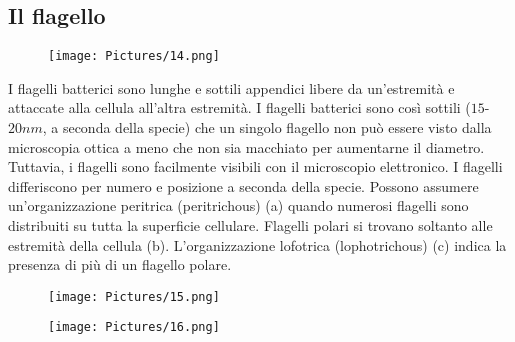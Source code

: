 \subsection{Il flagello}
\begin{figure}[H]
	\texttt{[image: Pictures/14.png]}
\end{figure}

I flagelli batterici sono lunghe e sottili appendici libere da un'estremità e attaccate alla cellula all'altra estremità. I flagelli batterici sono così 
sottili ($15$-$20 nm$, a seconda della specie) che un singolo flagello non può essere visto dalla microscopia ottica a meno che non sia macchiato per aumentarne 
il diametro. Tuttavia, i flagelli sono facilmente visibili con il microscopio elettronico. I flagelli differiscono per numero e posizione  a seconda della 
specie. Possono assumere un’organizzazione peritrica (peritrichous) (a) quando numerosi flagelli 
sono distribuiti su tutta la superficie cellulare. Flagelli polari si trovano soltanto alle estremità della cellula (b). L’organizzazione lofotrica 
(lophotrichous) (c) indica la presenza di più di un flagello polare. \\
\newpage
\begin{multicols}{2}
\begin{figure}[H]
	\texttt{[image: Pictures/15.png]}
\end{figure}
	
\begin{figure}[H]
	\texttt{[image: Pictures/16.png]}
\end{figure}
\end{multicols}

